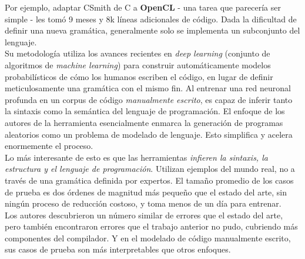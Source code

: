 Por ejemplo, adaptar CSmith de C a \textbf{OpenCL}\cite{Boujarwah1997CompilerTC} - una tarea que parecería ser simple - les tomó 9 meses y 8k líneas adicionales de código. Dada la dificultad de definir una nueva gramática, generalmente solo se implementa un subconjunto del lenguaje.\\

Su metodología utiliza los avances recientes en \textit{deep learning} (conjunto de algoritmos de \textit{machine learning}) para construir automáticamente modelos probabilísticos de cómo los humanos escriben el código, en lugar de definir meticulosamente una gramática con el mismo fin. Al entrenar una red neuronal profunda en un corpus de código \textit{manualmente escrito}, es capaz de inferir tanto la sintaxis como la semántica del lenguaje de programación. El enfoque de los autores de la herramienta esencialmente enmarca la generación de programas aleatorios como un problema de modelado de lenguaje. Esto simplifica y acelera enormemente el proceso.\\

Lo más interesante de esto es que las herramientas \textit{infieren la sintaxis, la estructura y el lenguaje de programación}. Utilizan ejemplos del mundo real, no a través de una gramática definida por expertos. El tamaño promedio de los casos de prueba es dos órdenes de magnitud más pequeño que el estado del arte, sin ningún proceso de reducción costoso, y toma menos de un día para entrenar.\\

Los autores descubrieron un número similar de errores que el estado del arte, pero también encontraron errores que el trabajo anterior no pudo, cubriendo más componentes del compilador. Y en el modelado de código manualmente escrito, sus casos de prueba son más interpretables que otros enfoques.\\

